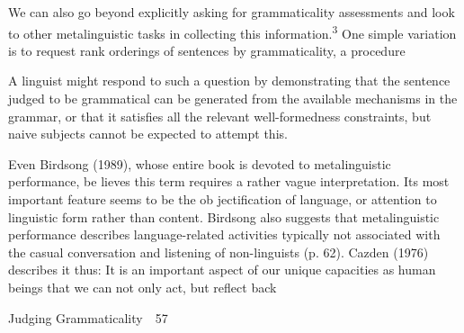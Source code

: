 \begin{styleStandard}
We can also go beyond explicitly asking for grammaticality assessments and look to other metalinguistic tasks in collecting this information.\textsuperscript{3}\textsuperscript{ }One simple variation is to request rank orderings of sentences by grammaticality, a procedure
\end{styleStandard}


\begin{listWWNumlvleveli}
\item 
\setcounter{listWWNumlvlevelii}{1}
\begin{listWWNumlvlevelii}
\item 
\setcounter{listWWNumlvleveliii}{0}
\begin{listWWNumlvleveliii}
\item 
\begin{styleStandard}
A linguist might respond to such a question by demonstrating that the sentence judged to be grammatical can be generated from the available mechanisms in the grammar, or that it satisfies all the relevant well-formedness constraints, but naive subjects cannot be expected to attempt this.
\end{styleStandard}


\item 
\begin{styleStandard}
Even Birdsong (1989), whose entire book is devoted to metalinguistic performance, be\- lieves this term requires a {\textquotedbl}rather vague interpretation.{\textquotedbl} Its most important feature seems to be the ob\- jectification of language, or attention to linguistic form rather than content. Birdsong also suggests that metalinguistic performance describes {\textquotedbl}language-related activities typically not associated with the casual conversation and listening of non-linguists{\textquotedbl} (p. 62). Cazden (1976) describes it thus: {\textquotedbl}It is an important aspect of our unique capacities as human beings that we can not only act, but reflect back
\end{styleStandard}


\end{listWWNumlvleveliii}
\end{listWWNumlvlevelii}
\end{listWWNumlvleveli}
\clearpage\setcounter{page}{1}\begin{styleStandard}
Judging Grammaticality\ \ 57
\end{styleStandard}


